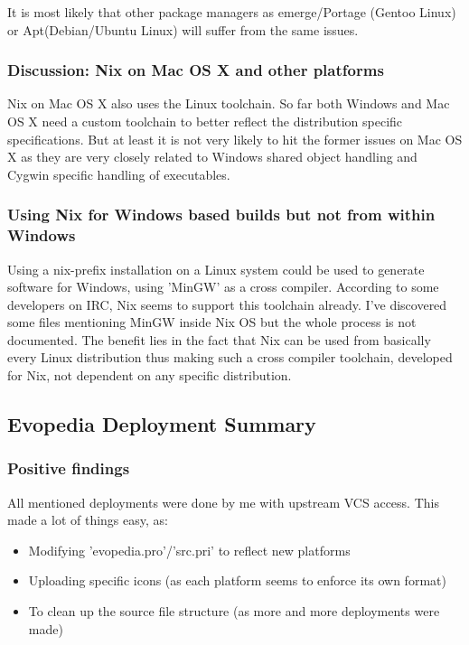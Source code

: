 \documentclass[a4paper,10pt]{article}
\begin{document}
It is most likely that other package managers as emerge/Portage (Gentoo Linux) or Apt(Debian/Ubuntu Linux) will suffer from the same issues. 

\subsubsection*{Discussion: Nix on Mac OS X and other platforms}
Nix on Mac OS X also uses the Linux toolchain. So far both Windows and Mac OS X need a custom toolchain to better reflect the distribution specific specifications. But at least it is not very likely to hit the former issues on Mac OS X as they are very closely related to Windows shared object handling and Cygwin specific handling of executables. \\

\subsubsection*{Using Nix for Windows based builds but not from within Windows}
Using a nix-prefix installation on a Linux system could be used to generate software for Windows, using 'MinGW' as a cross compiler. According to some developers on IRC, Nix seems to support this toolchain already. I've discovered some files mentioning MinGW inside Nix OS but the whole process is not documented. The benefit lies in the fact that Nix can be used from basically every Linux distribution thus making such a cross compiler toolchain, developed for Nix, not dependent on any specific distribution.












\newpage
\subsection{Evopedia Deployment Summary}
\subsubsection*{Positive findings}
All mentioned deployments were done by me with upstream VCS access. This made a lot of things easy, as:
\begin{itemize}
\item Modifying 'evopedia.pro'/'src.pri' to reflect new platforms
\item Uploading specific icons (as each platform seems to enforce its own format)
\item To clean up the source file structure (as more and more deployments were made)
\end{itemize}
\end{document}
